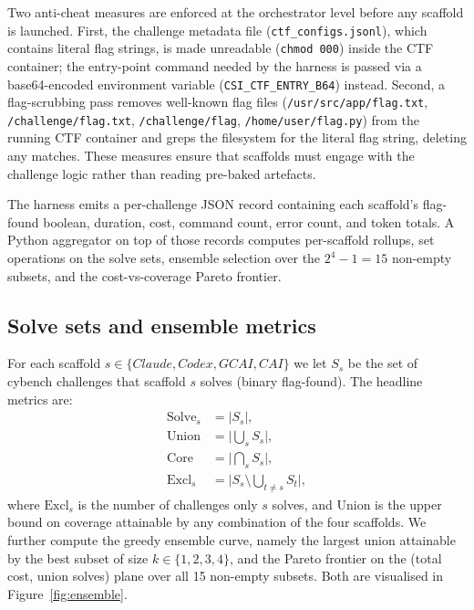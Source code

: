 Two anti-cheat measures are enforced at the orchestrator level before any scaffold is launched. First, the challenge metadata file (\texttt{ctf\_configs.jsonl}), which contains literal flag strings, is made unreadable (\texttt{chmod 000}) inside the CTF container; the entry-point command needed by the harness is passed via a base64-encoded environment variable (\texttt{CSI\_CTF\_ENTRY\_B64}) instead. Second, a flag-scrubbing pass removes well-known flag files (\texttt{/usr/src/app/flag.txt}, \texttt{/challenge/flag.txt}, \texttt{/challenge/flag}, \texttt{/home/user/flag.py}) from the running CTF container and greps the filesystem for the literal flag string, deleting any matches. These measures ensure that scaffolds must engage with the challenge logic rather than reading pre-baked artefacts.

The harness emits a per-challenge JSON record containing each scaffold's flag-found boolean, duration, cost, command count, error count, and token totals. A Python aggregator on top of those records computes per-scaffold rollups, set operations on the solve sets, ensemble selection over the $2^{4}-1 = 15$ non-empty subsets, and the cost-vs-coverage Pareto frontier.

\subsection{Solve sets and ensemble metrics}\label{sec:metrics}

For each scaffold $s \in \{Claude, Codex, GCAI, CAI\}$ we let $S_{s}$ be the set of cybench challenges that scaffold $s$ solves (binary flag-found). The headline metrics are:
\begin{align*}
\mathrm{Solve}_s &= |S_s|,                                              \\
\mathrm{Union}   &= \bigl|\textstyle\bigcup_s S_s\bigr|,                 \\
\mathrm{Core}    &= \bigl|\textstyle\bigcap_s S_s\bigr|,                 \\
\mathrm{Excl}_s  &= \bigl|S_s \setminus \textstyle\bigcup_{t \neq s} S_t\bigr|,
\end{align*}
where $\mathrm{Excl}_s$ is the number of challenges only $s$ solves, and $\mathrm{Union}$ is the upper bound on coverage attainable by any combination of the four scaffolds. We further compute the greedy ensemble curve, namely the largest union attainable by the best subset of size $k \in \{1, 2, 3, 4\}$, and the Pareto frontier on the (total cost, union solves) plane over all 15 non-empty subsets. Both are visualised in Figure~\ref{fig:ensemble}.
